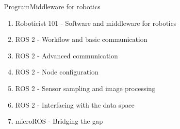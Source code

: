\begin{frame}{Program}{Middleware for robotics}
	\begin{enumerate}
		\item Roboticist 101 - Software and middleware for robotics
		\item ROS 2 - Workflow and basic communication
		\item ROS 2 - Advanced communication
		\item ROS 2 - Node configuration
		\item ROS 2 - Sensor sampling and image processing
		\item ROS 2 - Interfacing with the data space
		\item microROS - Bridging the gap
	\end{enumerate}
\end{frame}

